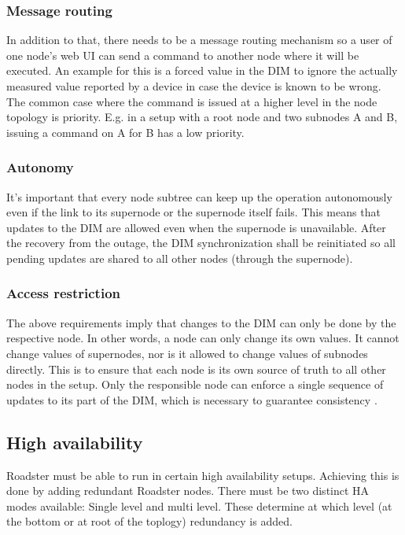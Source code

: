 \subsubsection{Message routing}
In addition to that, there needs to be a message routing mechanism so a user
of one node's web UI can send a command to another node where it will be
executed. An example for this is a forced value in the DIM to ignore the
actually measured value reported by a device in case the device is known to be
wrong. The common case where the command is issued at a higher level in the node
topology is priority. E.g. in a setup with a root node and two
subnodes A and B, issuing a command on A for B has a low priority.

\subsubsection{Autonomy}
It's important that every node subtree can keep up the operation autonomously even if the
link to its supernode or the supernode itself fails. This means that updates to
the \gls{DIM} are allowed even when the supernode is unavailable. After the
recovery from the outage, the \gls{DIM} synchronization shall be reinitiated so
all pending updates are shared to all other nodes (through the supernode).

\subsubsection{Access restriction}
The above requirements imply that changes to the \gls{DIM} can only be done by the
respective node. In other words, a node can only change its own values. It
cannot change values of supernodes, nor is it allowed to change values of
subnodes directly. This is to ensure that each node is its own source of truth
to all other nodes in the setup. Only the responsible node can enforce a single
sequence of updates to its part of the DIM, which is necessary to guarantee
consistency \cite[Chapter 5, Reliable Pub-Sub (Clone Pattern), Republishing
Updates from Clients]{zmq:zguide}.


\subsection{High availability}
Roadster must be able to run in certain high availability setups. Achieving
this is done by adding redundant Roadster nodes. There must be two distinct
\gls{HA} modes available: Single level and multi level. These determine at
which level (at the bottom or at root of the toplogy) redundancy is added.


